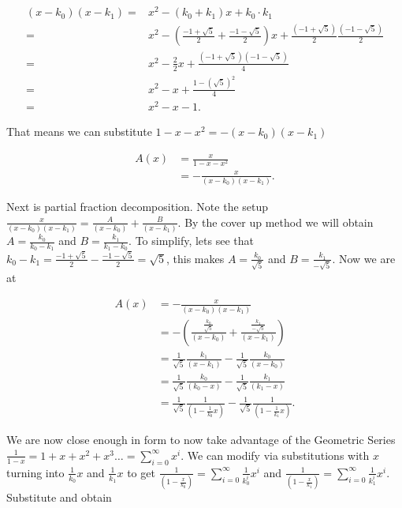 \documentclass{article}
\begin{document}
\begin{align*}
    (x-k_0)(x-k_1)=&x^2-(k_0+k_1)x+k_0\cdot k_1 \\
                  =&x^2-\left(\frac{-1+\sqrt{5}}{2}+\frac{-1-\sqrt{5}}{2}\right)x+\frac{(-1+\sqrt{5})}{2}\frac{(-1-\sqrt{5})}{2} \\
                  =&x^2-\frac{2}{2}x+\frac{(-1+\sqrt{5})(-1-\sqrt{5})}{4} \\
                  =&x^2-x+\frac{1-(\sqrt{5})^2}{4} \\
                  =&x^2-x-1.
\end{align*}

That means we can substitute $1-x-x^2=-(x-k_0)(x-k_1)$

\begin{align*}
    A(x)&=\frac{x}{1-x-x^2} \\
        &=-\frac{x}{(x-k_0)(x-k_1)}.
\end{align*}

Next is partial fraction decomposition. Note the setup $\frac{x}{(x-k_0)(x-k_1)}=\frac{A}{(x-k_0)}+\frac{B}{(x-k_1)}$. By the cover up method we will obtain $A=\frac{k_0}{k_0-k_1}$ and $B=\frac{k_1}{k_1-k_0}$. To simplify, lets see that $k_0-k_1=\frac{-1+\sqrt{5}}{2}-\frac{-1-\sqrt{5}}{2}=\sqrt{5}$, this makes $A=\frac{k_0}{\sqrt{5}}$ and $B=\frac{k_1}{-\sqrt{5}}$. Now we are at

\begin{align*}
    A(x)&=-\frac{x}{(x-k_0)(x-k_1)} \\
        &=-\left(\frac{\frac{k_0}{\sqrt{5}}}{(x-k_0)}+\frac{\frac{k_1}{-\sqrt{5}}}{(x-k_1)}\right) \\
        &=\frac{1}{\sqrt{5}}\frac{k_1}{(x-k_1)}-\frac{1}{\sqrt{5}}\frac{k_0}{(x-k_0)} \\
        &=\frac{1}{\sqrt{5}}\frac{k_0}{(k_0-x)}-\frac{1}{\sqrt{5}}\frac{k_1}{(k_1-x)} \\
        &=\frac{1}{\sqrt{5}}\frac{1}{(1-\frac{1}{k_0}x)}-\frac{1}{\sqrt{5}}\frac{1}{(1-\frac{1}{k_1}x)}.
\end{align*}

We are now close enough in form to now take advantage of the Geometric Series $\frac{1}{1-x}=1+x+x^2+x^3\ldots=\sum_{i=0}^{\infty} x^i$. We can modify via substitutions with $x$ turning into $\frac{1}{k_0}x$ and $\frac{1}{k_1}x$ to get $\frac{1}{(1-\frac{x}{k_0})}=\sum_{i=0}^{\infty} \frac{1}{k_0^i}x^i$ and $\frac{1}{(1-\frac{x}{k_1})}=\sum_{i=0}^{\infty} \frac{1}{k_1^i}x^i$. Substitute and obtain
\end{document}
